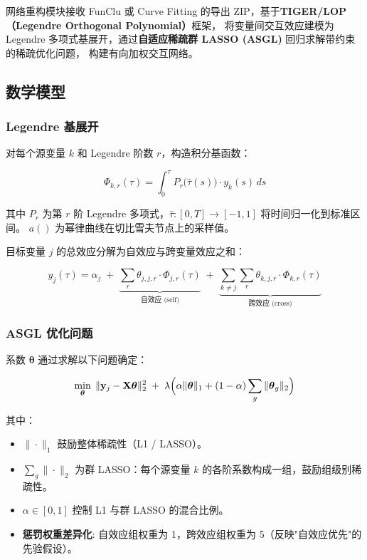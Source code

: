 \documentclass[12pt,a4paper]{ctexart}
\begin{document}
网络重构模块接收 FunClu 或 Curve Fitting 的导出 ZIP，基于\textbf{TIGER/LOP（Legendre Orthogonal Polynomial）}框架，
将变量间交互效应建模为 Legendre 多项式基展开，通过\textbf{自适应稀疏群 LASSO (ASGL)} 回归求解带约束的稀疏优化问题，
构建有向加权交互网络。

\subsection{数学模型}

\subsubsection{Legendre 基展开}

对每个源变量 $k$ 和 Legendre 阶数 $r$，构造积分基函数：

\[
\Phi_{k,r}(\tau) = \int_{0}^{\tau} P_r\bigl(\hat{\tau}(s)\bigr) \cdot y_k(s) \, ds
\]

其中 $P_r$ 为第 $r$ 阶 Legendre 多项式，$\hat{\tau}: [0, T] \to [-1, 1]$ 将时间归一化到标准区间。
$a()$ 为幂律曲线在切比雪夫节点上的采样值。

目标变量 $j$ 的总效应分解为自效应与跨变量效应之和：

\[
y_j(\tau) = \alpha_j \;+\;
\underbrace{\sum_{r} \theta_{j,j,r} \cdot \Phi_{j,r}(\tau)}_{\text{自效应 (self)}} \;+\;
\underbrace{\sum_{k \neq j} \sum_{r} \theta_{k,j,r} \cdot \Phi_{k,r}(\tau)}_{\text{跨效应 (cross)}}
\]

\subsubsection{ASGL 优化问题}

系数 $\boldsymbol{\theta}$ 通过求解以下问题确定：

\[
\min_{\boldsymbol{\theta}} \; \| \mathbf{y}_j - \mathbf{X}\boldsymbol{\theta} \|_2^2
\;+\; \lambda \Bigl( \alpha \|\boldsymbol{\theta}\|_1
+ (1 - \alpha) \sum_g \|\boldsymbol{\theta}_g\|_2 \Bigr)
\]

其中：
\begin{itemize}[leftmargin=*]
    \item $\|\cdot\|_1$ 鼓励整体稀疏性（L1 / LASSO）。
    \item $\sum_g \|\cdot\|_2$ 为群 LASSO：每个源变量 $k$ 的各阶系数构成一组，鼓励组级别稀疏性。
    \item $\alpha \in [0, 1]$ 控制 L1 与群 LASSO 的混合比例。
    \item \textbf{惩罚权重差异化}: 自效应组权重为 1，跨效应组权重为 5（反映"自效应优先"的先验假设）。
\end{itemize}
\end{document}
